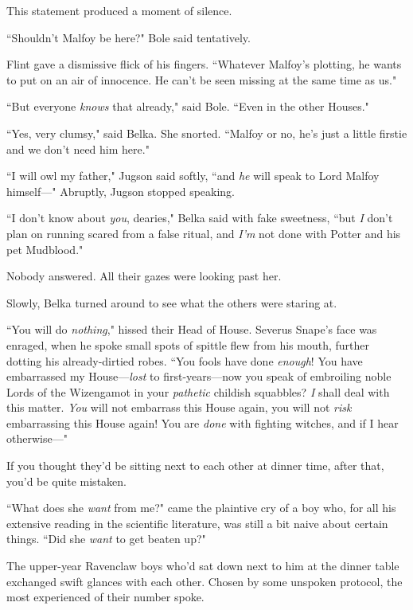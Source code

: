 This statement produced a moment of silence.

``Shouldn't Malfoy be here?" Bole said tentatively.

Flint gave a dismissive flick of his fingers. ``Whatever Malfoy's plotting, he wants to put on an air of innocence. He can't be seen missing at the same time as us."

``But everyone \emph{knows} that already," said Bole. ``Even in the other Houses."

``Yes, very clumsy," said Belka. She snorted. ``Malfoy or no, he's just a little firstie and we don't need him here."

``I will owl my father," Jugson said softly, ``and \emph{he} will speak to Lord Malfoy himself—" Abruptly, Jugson stopped speaking.

``I don't know about \emph{you}, dearies," Belka said with fake sweetness, ``but \emph{I} don't plan on running scared from a false ritual, and \emph{I'm} not done with Potter and his pet Mudblood."

Nobody answered. All their gazes were looking past her.

Slowly, Belka turned around to see what the others were staring at.

``You will do \emph{nothing}," hissed their Head of House. Severus Snape's face was enraged, when he spoke small spots of spittle flew from his mouth, further dotting his already-dirtied robes. ``You fools have done \emph{enough}! You have embarrassed my House—\emph{lost} to first-years—now you speak of embroiling noble Lords of the Wizengamot in your \emph{pathetic} childish squabbles? \emph{I} shall deal with this matter. \emph{You} will not embarrass this House again, you will not \emph{risk} embarrassing this House again! You are \emph{done} with fighting witches, and if I hear otherwise—"

\later

If you thought they'd be sitting next to each other at dinner time, after that, you'd be quite mistaken.

``What does she \emph{want} from me?" came the plaintive cry of a boy who, for all his extensive reading in the scientific literature, was still a bit naive about certain things. ``Did she \emph{want} to get beaten up?"

The upper-year Ravenclaw boys who'd sat down next to him at the dinner table exchanged swift glances with each other. Chosen by some unspoken protocol, the most experienced of their number spoke.

